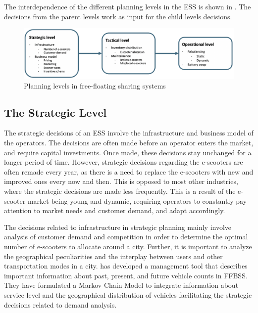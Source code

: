 The interdependence of the different planning levels in the ESS is shown in . The decisions from the parent levels work as input for the child levels decisions. 
\\
\begin{figure}[H]
    \centering
    \includegraphics[width=1\columnwidth]{Images/planning_levels.png}
    \caption{Planning levels in free-floating sharing systems}
    \label{fig:planning}
\end{figure}

\subsection{The Strategic Level}\label{strategic}
The strategic decisions of an ESS involve the infrastructure and business model of the operators. The decisions are often made before an operator enters the market, and require capital investments. Once made, these decisions stay unchanged for a longer period of time. However, strategic decisions regarding the e-scooters are often remade every year, as there is a need to replace the e-scooters with new and improved ones every now and then. This is opposed to most other industries, where the strategic decisions are made less frequently. This is a result of the e-scooter market being young and dynamic, requiring operators to constantly pay attention to market needs and customer demand, and adapt accordingly. 

The decisions related to infrastructure in strategic planning mainly involve analysis of customer demand and competition in order to determine the optimal number of e-scooters to allocate around a city. Further, it is important to analyze the geographical peculiarities and the interplay between users and other transportation modes in a city. \citet{templ_fleet_2020} has developed a management tool that describes important information about past, present, and future vehicle counts in FFBSS. They have formulated a Markov Chain Model to integrate information about service level and the geographical distribution of vehicles facilitating the strategic decisions related to demand analysis. 

